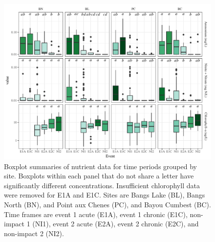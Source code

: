 \documentclass[letterpaper,12pt]{article}\usepackage[]{graphicx}\usepackage[]{color}
\makeatletter
\def\maxwidth{ %
  \ifdim\Gin@nat@width>\linewidth
    \linewidth
  \else
    \Gin@nat@width
  \fi
}
\makeatother
\begin{document}
\begin{figure}[!ht]

{\centering \includegraphics[width=\maxwidth]{figs/Fig8} 

}

\caption[Boxplot summaries of nutrient data for time periods grouped by site]{Boxplot summaries of nutrient data for time periods grouped by site. Boxplots within each panel that do not share a letter have significantly different concentrations. Insufficient chlorophyll data were removed for E1A and E1C. Sites are Bangs Lake (BL), Bangs North (BN), and Point aux Chenes (PC), and Bayou Cumbest (BC).  Time frames are event 1 acute (E1A), event 1 chronic (E1C), non-impact 1 (NI1), event 2 acute (E2A), event 2 chronic (E2C), and non-impact 2 (NI2).}\label{fig:Fig8}
\end{figure}



\clearpage


\end{document}
